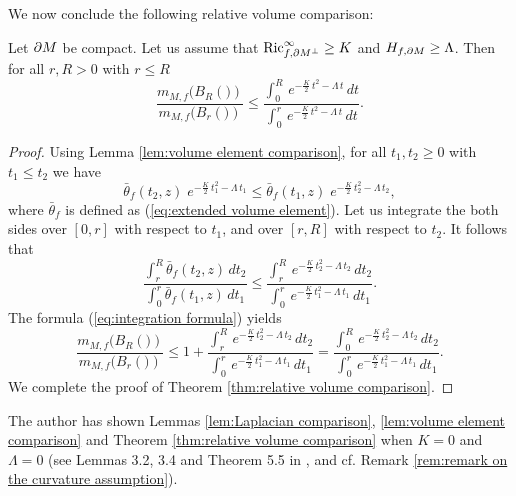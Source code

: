 We now conclude the following relative volume comparison:
\begin{thm}\label{thm:relative volume comparison}
Let $\partial M$ be compact.
Let us assume that
$\operatorname{Ric}^{\infty}_{f,\partial M^{\perp}}\geq K$ and $H_{f,\partial M}\geq \Lambda$.
Then for all $r,R>0$ with $r\leq R$
\begin{equation*}
\frac{m_{M,f}(B_{R}(\bm))}{ m_{M,f}(B_{r}(\bm))}\leq \frac{  \int^{R}_{0}\,e^{-\frac{K}{2}\,t^{2}-\Lambda\,t} \,dt }{  \int^{r}_{0}\,e^{-\frac{K}{2}\,t^{2}-\Lambda\,t} \,dt }.
\end{equation*}
\end{thm}
\begin{proof}
Using Lemma \ref{lem:volume element comparison},
for all $t_{1},t_{2}\geq 0$ with $t_{1}\leq t_{2}$ we have
\begin{equation*}
\bar{\theta}_{f}(t_{2},z)\; e^{-\frac{K}{2}\,t^{2}_{1}-\Lambda\,t_{1}} \leq \bar{\theta}_{f}(t_{1},z)\; e^{-\frac{K}{2}\,t^{2}_{2}-\Lambda\,t_{2}},
\end{equation*}
where $\bar{\theta}_{f}$ is defined as (\ref{eq:extended volume element}).
Let us integrate the both sides over $[0,r]$ with respect to $t_{1}$,
and over $[r,R]$ with respect to $t_{2}$.
It follows that
\begin{equation*}
\frac{\int^{R}_{r}\bar{\theta}_{f}(t_{2},z)\,dt_{2}}{\int^{r}_{0}\bar{\theta}_{f}(t_{1},z)\,dt_{1}}\leq \frac{\int^{R}_{r}\,  e^{-\frac{K}{2}\,t^{2}_{2}-\Lambda\,t_{2}}   \,dt_{2}}{  \int^{r}_{0}\,  e^{-\frac{K}{2}\,t^{2}_{1}-\Lambda\,t_{1}}   \,dt_{1}   }.
\end{equation*}
The formula (\ref{eq:integration formula}) yields
\begin{equation*}
          \frac{m_{M,f}( B_{R}(\bm))}{ m_{M,f}( B_{r}(\bm))  }\leq 1+\frac{\int^{R}_{r}\,  e^{-\frac{K}{2}\,t^{2}_{2}-\Lambda\,t_{2}}   \,dt_{2}}{  \int^{r}_{0}\,  e^{-\frac{K}{2}\,t^{2}_{1}-\Lambda\,t_{1}}   \,dt_{1}   }
    =      \frac{  \int^{R}_{0}\,e^{-\frac{K}{2}\,t^{2}_{2}-\Lambda\,t_{2}} \,dt_{2} }{  \int^{r}_{0}\,e^{-\frac{K}{2}\,t^{2}_{1}-\Lambda\,t_{1}} \,dt_{1} }.
\end{equation*}
We complete the proof of Theorem \ref{thm:relative volume comparison}.
\end{proof}

\begin{rem}
The author \cite{S1} has shown Lemmas \ref{lem:Laplacian comparison}, \ref{lem:volume element comparison} and Theorem \ref{thm:relative volume comparison} when $K=0$ and $\Lambda=0$ (see Lemmas 3.2, 3.4 and Theorem 5.5 in \cite{S1}, and cf. Remark \ref{rem:remark on the curvature assumption}).
\end{rem}

